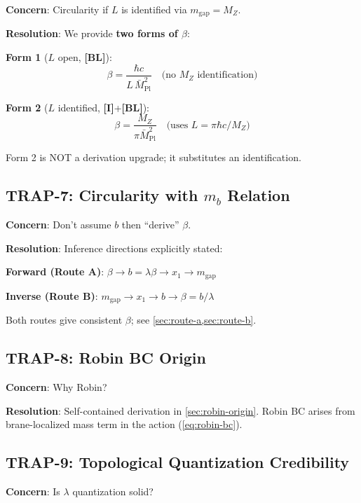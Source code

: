 \documentclass[11pt,a4paper]{article}
\newcommand{\Mpl}{\bar{M}_{\mathrm{Pl}}}
\newcommand{\mgap}{m_{\mathrm{gap}}}
\newcommand{\mb}{m_b}
\newcommand{\MZ}{M_Z}
\newcommand{\tagI}{\textbf{[I]}}
\newcommand{\tagBL}{\textbf{[BL]}}
\theoremstyle{definition}
\theoremstyle{plain}
\theoremstyle{remark}
\begin{document}
\textbf{Concern}: Circularity if $L$ is identified via $\mgap = \MZ$.

\textbf{Resolution}: We provide \textbf{two forms of $\beta$}:

\textbf{Form 1} ($L$ open, \tagBL{}):
\begin{equation}
\beta = \frac{\hbar c}{L \, \Mpl^2} \quad \text{(no } \MZ \text{ identification)}
\label{eq:beta-L-open}
\end{equation}

\textbf{Form 2} ($L$ identified, \tagI{}+\tagBL{}):
\begin{equation}
\beta = \frac{\MZ}{\pi\Mpl^2} \quad \text{(uses } L = \pi\hbar c/\MZ \text{)}
\label{eq:beta-L-identified}
\end{equation}

Form 2 is NOT a derivation upgrade; it substitutes an identification.

\subsection{TRAP-7: Circularity with $\mb$ Relation}
\label{sec:trap7}

\textbf{Concern}: Don't assume $b$ then ``derive'' $\beta$.

\textbf{Resolution}: Inference directions explicitly stated:

\textbf{Forward (Route A)}: $\beta \to b = \lambda\beta \to x_1 \to \mgap$

\textbf{Inverse (Route B)}: $\mgap \to x_1 \to b \to \beta = b/\lambda$

Both routes give consistent $\beta$; see \cref{sec:route-a,sec:route-b}.

\subsection{TRAP-8: Robin BC Origin}
\label{sec:trap8}

\textbf{Concern}: Why Robin?

\textbf{Resolution}: Self-contained derivation in \cref{sec:robin-origin}. Robin BC
arises from brane-localized mass term in the action (\cref{eq:robin-bc}).

\subsection{TRAP-9: Topological Quantization Credibility}
\label{sec:trap9}

\textbf{Concern}: Is $\lambda$ quantization solid?
\end{document}
